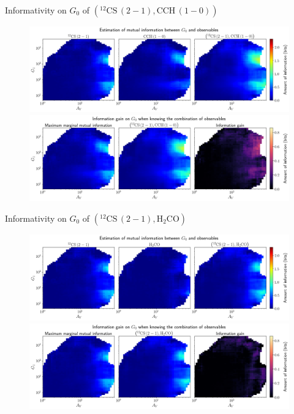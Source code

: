 \documentclass{beamer}
\begin{document}
\begin{frame}{Informativity on $G_0$ of $\left(\mathrm{^{12}CS\,(2-1)},\mathrm{CCH\,(1-0)}\right)$}
    \begin{figure}
        \centering
        \includegraphics[width=0.95\linewidth]{../mi/g0__12cs21_cch10_mi.png}
        \vfill
        \includegraphics[width=0.95\linewidth]{../mi/g0__12cs21_cch10_mi_gain.png}
    \end{figure}
\end{frame}

\begin{frame}{Informativity on $G_0$ of $\left(\mathrm{^{12}CS\,(2-1)},\mathrm{H_2CO}\right)$}
    \begin{figure}
        \centering
        \includegraphics[width=0.95\linewidth]{../mi/g0__12cs21_h2co_mi.png}
        \vfill
        \includegraphics[width=0.95\linewidth]{../mi/g0__12cs21_h2co_mi_gain.png}
    \end{figure}
\end{frame}
\end{document}
